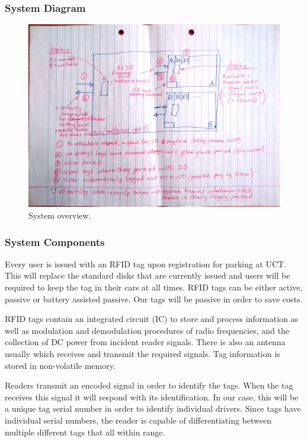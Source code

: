\subsubsection{System Diagram}
\begin{figure}[H]
\begin{center}
\includegraphics[scale=0.13]{data/D2.jpg}
\caption{System overview.}
\label{fig:soft-overview2}
\end{center}
\end{figure}

\subsubsection{System Components}
Every user is issued with an RFID tag upon registration for parking at UCT. This will replace the
standard disks that are currently issued and users will be required to keep the tag in their cars at all
times. RFID tags can be either active, passive or battery assisted passive. Our tags will be passive in
order to save costs.

RFID tags contain an integrated circuit (IC) to store and process information as well as modulation
and demodulation procedures of radio frequencies, and the collection of DC power from incident reader signals. There is also an antenna usually which receives and transmit the required signals. Tag
information is stored in non-volatile memory.

Readers transmit an encoded signal in order to identify the tags. When the tag receives this signal it
will respond with its identification. In our case, this will be a unique tag serial number in order to
identify individual drivers. Since tags have individual serial numbers, the reader is capable of
differentiating between multiple different tags that all within range.

